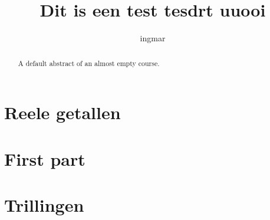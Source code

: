 \documentclass{xourse}
\title{Dit is een test tesdrt uuooi}
\author{ingmar}
\begin{document}
\begin{abstract}
    A default abstract of an almost empty course.
\end{abstract}
\maketitle

\part{Reele getallen}

\part{First part}


\part{Trillingen}
\end{document}
